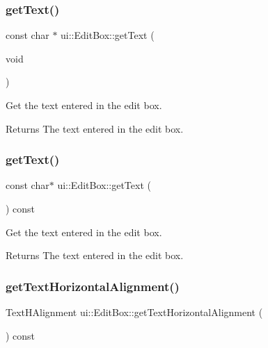 \subsubsection{\texorpdfstring{get\+Text()}{getText()}\hspace{0.1cm}{\footnotesize\ttfamily [1/2]}}
{\footnotesize\ttfamily const char $\ast$ ui\+::\+Edit\+Box\+::get\+Text (\begin{DoxyParamCaption}\item[{void}]{ }\end{DoxyParamCaption})}

Get the text entered in the edit box. \begin{DoxyReturn}{Returns}
The text entered in the edit box. 
\end{DoxyReturn}
\mbox{\label{classui_1_1EditBox_a78d728fb111be80c389ec266382e91cc}} 
\subsubsection{\texorpdfstring{get\+Text()}{getText()}\hspace{0.1cm}{\footnotesize\ttfamily [2/2]}}
{\footnotesize\ttfamily const char$\ast$ ui\+::\+Edit\+Box\+::get\+Text (\begin{DoxyParamCaption}{ }\end{DoxyParamCaption}) const}

Get the text entered in the edit box. \begin{DoxyReturn}{Returns}
The text entered in the edit box. 
\end{DoxyReturn}
\mbox{\label{classui_1_1EditBox_a4fa4d53ceaa22523da93c430b0182a1f}} 
\subsubsection{\texorpdfstring{get\+Text\+Horizontal\+Alignment()}{getTextHorizontalAlignment()}}
{\footnotesize\ttfamily Text\+H\+Alignment ui\+::\+Edit\+Box\+::get\+Text\+Horizontal\+Alignment (\begin{DoxyParamCaption}{ }\end{DoxyParamCaption}) const}

